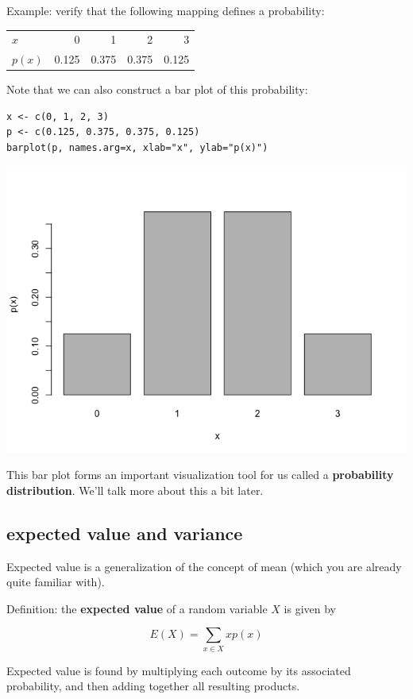 \documentclass[11pt]{article}
\begin{document}
Example: verify that the following mapping defines a probability:

\begin{center}
\begin{tabular}{lrrrr}
$x$ & 0 & 1 & 2 & 3\\
$p(x)$ & 0.125 & 0.375 & 0.375 & 0.125\\
\end{tabular}
\end{center}

Note that we can also construct a bar plot of this probability:

\begin{verbatim}
x <- c(0, 1, 2, 3)
p <- c(0.125, 0.375, 0.375, 0.125)
barplot(p, names.arg=x, xlab="x", ylab="p(x)")
\end{verbatim}

\includegraphics[width=.9\linewidth]{figures/week1/barplot.png}


This bar plot forms an important visualization tool for us called a \textbf{probability distribution}.  We'll talk more about this a bit later.

\subsection*{expected value and variance}
\label{sec-2-2}
Expected value is a generalization of the concept of mean (which you are already quite familiar with).

Definition: the \textbf{expected value} of a random variable $X$ is given by

\[
E(X) = \sum_{x\in X}xp(x)
\]

Expected value is found by multiplying each outcome by its associated probability, and then adding together all resulting products.
\end{document}
